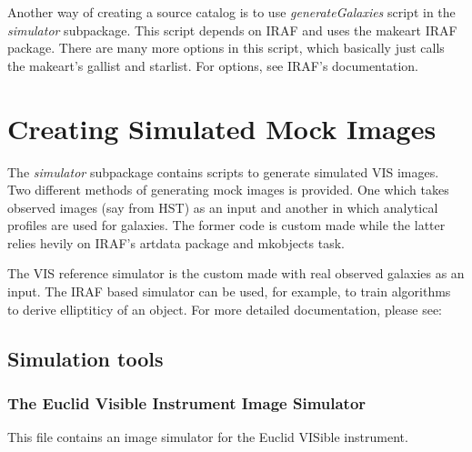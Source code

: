\documentclass[a4paper,12pt,english]{sphinxmanual}
\begin{document}
Another way of creating a source catalog is to use \emph{generateGalaxies} script in the \emph{simulator} subpackage.
This script depends on IRAF and uses the makeart IRAF package. There are many more options in this script,
which basically just calls the makeart's gallist and starlist. For options, see IRAF's documentation.


\chapter{Creating Simulated Mock Images}
\label{index:creating-simulated-mock-images}
The \emph{simulator} subpackage contains scripts to generate simulated VIS images. Two different methods
of generating mock images is provided. One which takes observed images (say from HST) as an input and
another in which analytical profiles are used for galaxies. The former code is custom made while the
latter relies hevily on IRAF's artdata package and mkobjects task.

The VIS reference simulator is the custom made with real observed galaxies as an input. The IRAF
based simulator can be used, for example, to train algorithms to derive elliptiticy of an object.
For more detailed documentation, please see:


\section{Simulation tools}
\label{simulator:module-simulator.simulator}\label{simulator::doc}\label{simulator:simulation-tools}

\subsection{The Euclid Visible Instrument Image Simulator}
\label{simulator:the-euclid-visible-instrument-image-simulator}
This file contains an image simulator for the Euclid VISible instrument.
\end{document}
